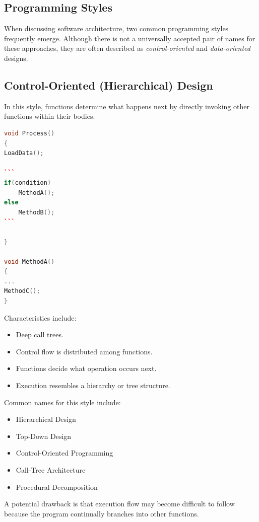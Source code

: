 \subsection{Programming Styles}

When discussing software architecture, two common programming styles frequently emerge. Although there is not a universally accepted pair of names for these approaches, they are often described as \emph{control-oriented} and \emph{data-oriented} designs.

\subsection{Control-Oriented (Hierarchical) Design}

In this style, functions determine what happens next by directly invoking other functions within their bodies.

\begin{lstlisting}[language=C++]
void Process()
{
LoadData();

```
if(condition)
    MethodA();
else
    MethodB();
```

}

void MethodA()
{
...
MethodC();
}
\end{lstlisting}

Characteristics include:

\begin{itemize}
\item Deep call trees.
\item Control flow is distributed among functions.
\item Functions decide what operation occurs next.
\item Execution resembles a hierarchy or tree structure.
\end{itemize}

Common names for this style include:

\begin{itemize}
\item Hierarchical Design
\item Top-Down Design
\item Control-Oriented Programming
\item Call-Tree Architecture
\item Procedural Decomposition
\end{itemize}

A potential drawback is that execution flow may become difficult to follow because the program continually branches into other functions.

